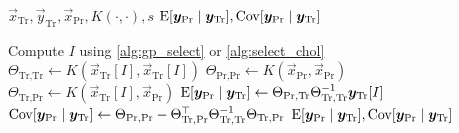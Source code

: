 \begin{algorithmic}[1]
  \REQUIRE \(
    \vec{x}_\text{Tr}, \vec{y}_\text{Tr},
    \vec{x}_\text{Pr}, K(\cdot, \cdot), s
  \)
  \ENSURE \(
      \operatorname{E}[\bm{y}_\text{Pr} \mid \bm{y}_\text{Tr}],
    \operatorname{Cov}[\bm{y}_\text{Pr} \mid \bm{y}_\text{Tr}]
  \)

  \STATE Compute \( I \) using \cref{alg:gp_select} or \cref{alg:select_chol}
  \STATE \(
    \Theta_{\text{Tr}, \text{Tr}} \gets
    K(\vec{x}_\text{Tr}[I], \vec{x}_\text{Tr}[I])
  \)
  \STATE \(
    \Theta_{\text{Pr}, \text{Pr}} \gets
    K(\vec{x}_\text{Pr}, \vec{x}_\text{Pr})
  \)
  \STATE \(
    \Theta_{\text{Tr}, \text{Pr}} \gets
    K(\vec{x}_\text{Tr}[I], \vec{x}_\text{Pr})
  \)
  \STATE \(
    \operatorname{E}[\bm{y}_\text{Pr} \mid \bm{y}_\text{Tr}] \gets
    \Theta_{\text{Pr}, \text{Tr}} \Theta_{\text{Tr}, \text{Tr}}^{-1}
    \bm{y}_\text{Tr}[I]
  \)
  \STATE \(
    \operatorname{Cov}[\bm{y}_\text{Pr} \mid \bm{y}_\text{Tr}] \gets
    \Theta_{\text{Pr}, \text{Pr}} -
    \Theta_{\text{Tr}, \text{Pr}}^{\top} \Theta_{\text{Tr}, \text{Tr}}^{-1}
    \Theta_{\text{Tr}, \text{Pr}}
  \)
  \RETURN \(
      \operatorname{E}[\bm{y}_\text{Pr} \mid \bm{y}_\text{Tr}],
    \operatorname{Cov}[\bm{y}_\text{Pr} \mid \bm{y}_\text{Tr}]
  \)
\end{algorithmic}

